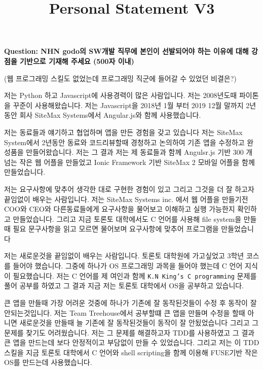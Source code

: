 \documentclass[12pt]{article}
\begin{document}
\title{Personal Statement V3}
\maketitle

\textbf{Question: NHN godo의 SW개발 직무에 본인이 선발되어야 하는 이유에 대해 강점을 기반으로 기재해 주세요 (500자 이내)}

\bigskip

(웹 프로그래밍 스킬도 없었는데 프로그래밍 직군에 들어갈 수 있었던 비결은?)

\bigskip

저는 Python 하고 Javascript에 사용경력이 많은 사람입니다. 저는 2008년도때 파이톤을 꾸준이 사용해왔습니다. 저는 Javascript을 2018년 1월 부터 2019 12월 말까지 2년동안 회사 SiteMax Systems에서 Angular.js와 함께 사용했습니다.

\bigskip

저는 동료들과 얘기하고 협업하며 앱을 만든 경험을 갖고 있습니다 저는 SiteMax System에서 2년동안 동료와 코드리뷰할때 경청하고 논의하여 기존 앱을 수정하고 완성품을 만들어왔습니다.
저는 그 결과 저는 제 동료들과 함께 Angulsr.js 기반 300 개 넘는 작은 웹 어플을 만들었고 Ionic Framework 기반 SiteMax 2 모바일 어플을 함께 만들었습니다.

\bigskip

저는 요구사항에 맞추어 생각한 대로 구현한 경험이 있고 그리고 그것을 더 잘 하고자 끝임없이 배우는 사람입니다.
저는 SiteMax Systems inc. 에서 웹 어플을 만들기전 COO와 CEO와 다른동료들에게 요구사항을 물어보고 이해하고 실행 가능한지 확인하고 만들었습니다.
그리고 지금 토론토 대학에서도 C 언어를 사용해 file system을 만들때 필요 문구사항을 읽고 모르면 물어보며 요구사항에 맞추어 프로그램을 만들었습니다

\bigskip

저는 새로운것을 끝임없이 배우는 사람입니다.
토론토 대학원에 가고싶었고 3학년 코스를 들어야 했습니다.
그중에 하나가 OS 프로그래밍 과목을 들어야 했는데 C 언어 지식이 필요했습니다.
저는 C 언어를 제 여인과 함께 \texttt{K.N King's C programming} 문제를 풀어 공부를 하였고 그 결과 지금 저는 토론토 대학에서 OS을 공부하고 있습니다.

\bigskip

큰 앱을 만들때 가장 어려운 것중에 하나가 기존에 잘 동작된것들이 수정 후 동작이 잘 안되는것입니다.
저는 Team Treehouse에서 공부할떄 큰 앱을 만들며 수정을 할때 아니면 새로운것을 만들때 늘 기존에 잘 동작된것들이 동작이 잘 안됬었습니다 그리고 그 문제를 찾기도 어려웠습니다.
저는 그 문제를 해결하고자 TDD를 사용하였고 그 결과 큰 앱을 만드는데 보다 안정적이고 부담없이 만들 수 있었습니다.
그리고 저는 이 TDD 스킬을 지금 토론토 대학에서 C 언어와 shell scripting을 함께 이용해 FUSE기반 작은 OS를 만드는데 사용했습니다.
\end{document}
